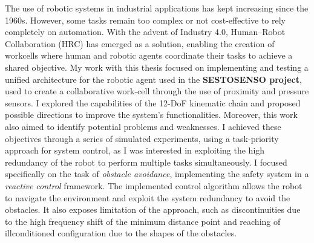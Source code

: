 \begin{abstracts}
The use of robotic systems in industrial applications has kept increasing since the 1960s. However, some tasks remain too complex or not cost-effective to rely completely on automation. With the advent of Industry 4.0, Human–Robot Collaboration (HRC) has emerged as a solution, enabling the creation of workcells where human and robotic agents coordinate their tasks to achieve a shared objective.
My work with this thesis focused on implementing and testing a unified architecture for the robotic agent used in the \textbf{SESTOSENSO project}, used to create a collaborative work-cell through the use of proximity and pressure sensors.
I explored the capabilities of the 12-DoF kinematic chain and proposed possible directions to improve the system’s functionalities. Moreover, this work also aimed to identify potential problems and weaknesses. I achieved these objectives through a series of simulated experiments, using a task-priority approach for system control, as I was interested in exploiting the high redundancy of the robot to perform multiple tasks simultaneously. I focused specifically on the task of \textit{obstacle avoidance}, implementing the safety system in a \textit{reactive control} framework. The implemented control algorithm allows the robot to navigate the environment and exploit the system redundancy to avoid the obstacles. It also exposes limitation of the approach, such as discontinuities due to the high frequency shift of the minimum distance point and reaching of illconditioned configuration due to the shapes of the obstacles.

\end{abstracts}

